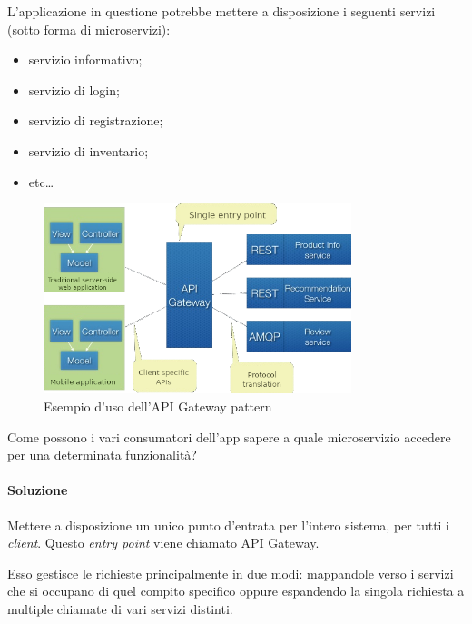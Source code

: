 L'applicazione in questione potrebbe mettere a disposizione i seguenti servizi (sotto forma di microservizi):
\begin{itemize}[noitemsep]
	\item servizio informativo;
	\item servizio di login;
	\item servizio di registrazione;
	\item servizio di inventario;
	\item etc\dots
\end{itemize}


\begin{figure}[H]
	\centering
	\includegraphics[width=0.8\textwidth]{immagini/apigateway.png}
	\caption[API Gateway]{Esempio d'uso dell'API Gateway pattern\footnotemark}
	\label{fig:api-gateway}
\end{figure}

Come possono i vari consumatori dell'app sapere a quale microservizio accedere per una determinata funzionalità?

\paragraph*{Soluzione} Mettere a disposizione un unico punto d'entrata per l'intero sistema, per tutti i \textit{client}.
Questo \textit{entry point} viene chiamato API Gateway.

Esso gestisce le richieste principalmente in due modi:
mappandole verso i servizi che si occupano di quel compito specifico oppure espandendo la singola richiesta a multiple chiamate di vari servizi distinti.

